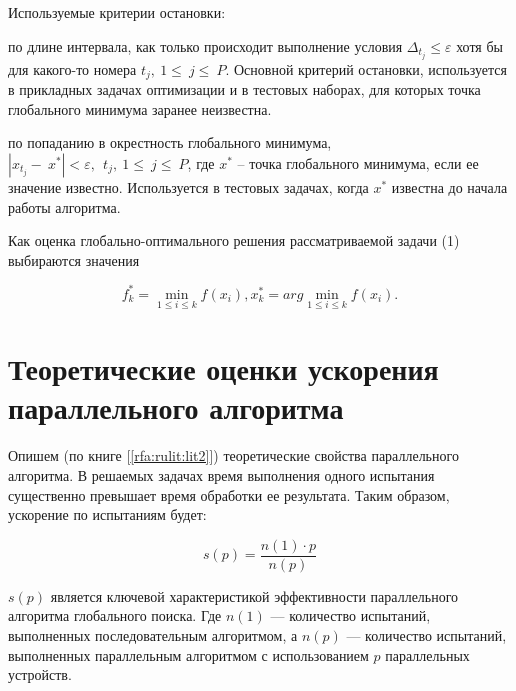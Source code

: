 \documentclass[10pt,a4paper]{book}
\begin{document}
Используемые критерии остановки: 

	по длине интервала, как только происходит выполнение условия \(\Delta_{t_j}\leqslant \varepsilon\) хотя бы для какого-то номера $t_j,\ 1\le\ j\le\ P$. Основной критерий остановки, используется в прикладных задачах оптимизации и в тестовых наборах, для которых точка глобального минимума заранее неизвестна. 
	 
	по попаданию в окрестность глобального минимума, $\left|x_{t_j}-\ x^\ast\right|<\varepsilon,\ \ t_j,\ 1\le\ j\le\ P$, где $x^\ast$ -- точка глобального минимума, если ее значение известно. Используется в тестовых задачах, когда $x^\ast$ известна до начала работы алгоритма.
	
Как оценка глобально-оптимального решения рассматриваемой задачи (1) выбираются значения 


\begin{equation}
f_k^*=\min_{1\leqslant i \leqslant k}f(x_i), x_k^*=arg \min_{1\leqslant i \leqslant k}f(x_i).
\end{equation}


\section{Теоретические оценки ускорения параллельного алгоритма}
Опишем (по книге [\ref{rfa:rulit:lit2}]) теоретические свойства параллельного алгоритма. В решаемых задачах время выполнения одного испытания существенно превышает время обработки ее результата. Таким образом, ускорение по испытаниям будет:

\begin{equation} \label{par_trl_ref}
s(p) = \frac{n(1) \cdot p}{n(p)}
\end{equation}

$s(p)$ является ключевой характеристикой эффективности параллельного алгоритма глобального поиска. Где $n(1)$ — количество испытаний, выполненных последовательным алгоритмом, а $n(p)$ — количество испытаний, выполненных параллельным алгоритмом с использованием $p$ параллельных устройств.
\end{document}
